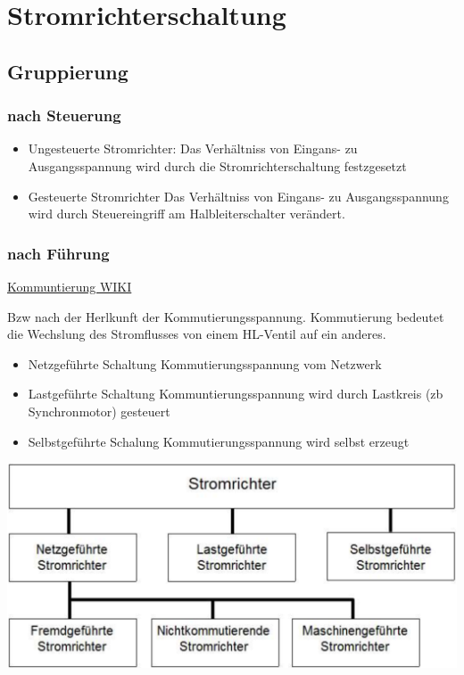 \section{Stromrichterschaltung}
\subsection{Gruppierung}
\subsubsection{nach Steuerung}
\begin{itemize}
    \item Ungesteuerte Stromrichter:
        \subitem Das Verhältniss von Eingans- zu Ausgangsspannung wird durch die Stromrichterschaltung festzgesetzt
    \item Gesteuerte Stromrichter
        \subitem Das Verhältniss von Eingans- zu Ausgangsspannung wird durch Steuereingriff am Halbleiterschalter verändert. 
\end{itemize}

\subsubsection{nach Führung}
\href{https://de.wikipedia.org/wiki/Kommutierung}{Kommuntierung WIKI}\newline
\begin{minipage}{0.6\linewidth}
Bzw nach der Herlkunft der Kommutierungsspannung.\newline
Kommutierung bedeutet die Wechslung des Stromflusses von einem HL-Ventil auf ein anderes.
\begin{itemize}
    \item Netzgeführte Schaltung
        \subitem Kommutierungsspannung vom Netzwerk
    \item Lastgeführte Schaltung
        \subitem Kommuntierungsspannung wird durch Lastkreis (zb Synchronmotor) gesteuert
    \item Selbstgeführte Schalung
        \subitem Kommutierungsspannung wird selbst erzeugt
\end{itemize}
\end{minipage}
\begin{minipage}{0.4\linewidth}
    \includegraphics[width=\linewidth]{images/StromrichterKennzeichnung}\newline
\end{minipage}

